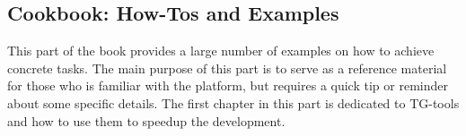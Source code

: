 \begin{partbacktext}
\part{Cookbook: How-Tos and Examples}\label{part-III}
  This part of the book provides a large number of examples on how to achieve concrete tasks.
  The main purpose of this part is to serve as a reference material for those who is familiar with the platform, but requires a quick tip or reminder about some specific details.
  The first chapter in this part is dedicated to TG-tools and how to use them to speedup the development.
\end{partbacktext}